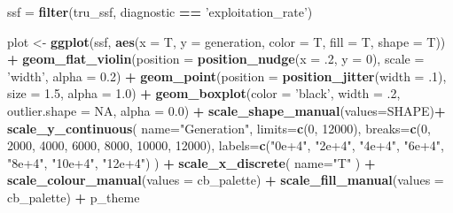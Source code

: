 \documentclass[]{book}
\newenvironment{Shaded}{\begin{snugshade}}{\end{snugshade}}
\newcommand{\DataTypeTok}[1]{\textcolor[rgb]{0.13,0.29,0.53}{#1}}
\newcommand{\DecValTok}[1]{\textcolor[rgb]{0.00,0.00,0.81}{#1}}
\newcommand{\FloatTok}[1]{\textcolor[rgb]{0.00,0.00,0.81}{#1}}
\newcommand{\KeywordTok}[1]{\textcolor[rgb]{0.13,0.29,0.53}{\textbf{#1}}}
\newcommand{\NormalTok}[1]{#1}
\newcommand{\OperatorTok}[1]{\textcolor[rgb]{0.81,0.36,0.00}{\textbf{#1}}}
\newcommand{\OtherTok}[1]{\textcolor[rgb]{0.56,0.35,0.01}{#1}}
\newcommand{\StringTok}[1]{\textcolor[rgb]{0.31,0.60,0.02}{#1}}
\begin{document}
\begin{Shaded}
\begin{Highlighting}[]
\NormalTok{ssf =}\StringTok{ }\KeywordTok{filter}\NormalTok{(tru_ssf, diagnostic }\OperatorTok{==}\StringTok{ 'exploitation_rate'}\NormalTok{)}

\NormalTok{plot <-}\StringTok{ }\KeywordTok{ggplot}\NormalTok{(ssf, }\KeywordTok{aes}\NormalTok{(}\DataTypeTok{x =}\NormalTok{ T, }\DataTypeTok{y =}\NormalTok{ generation, }\DataTypeTok{color =}\NormalTok{ T, }\DataTypeTok{fill =}\NormalTok{ T, }\DataTypeTok{shape =}\NormalTok{ T)) }\OperatorTok{+}
\StringTok{  }\KeywordTok{geom_flat_violin}\NormalTok{(}\DataTypeTok{position =} \KeywordTok{position_nudge}\NormalTok{(}\DataTypeTok{x =} \FloatTok{.2}\NormalTok{, }\DataTypeTok{y =} \DecValTok{0}\NormalTok{), }\DataTypeTok{scale =} \StringTok{'width'}\NormalTok{, }\DataTypeTok{alpha =} \FloatTok{0.2}\NormalTok{) }\OperatorTok{+}
\StringTok{  }\KeywordTok{geom_point}\NormalTok{(}\DataTypeTok{position =} \KeywordTok{position_jitter}\NormalTok{(}\DataTypeTok{width =} \FloatTok{.1}\NormalTok{), }\DataTypeTok{size =} \FloatTok{1.5}\NormalTok{, }\DataTypeTok{alpha =} \FloatTok{1.0}\NormalTok{) }\OperatorTok{+}
\StringTok{  }\KeywordTok{geom_boxplot}\NormalTok{(}\DataTypeTok{color =} \StringTok{'black'}\NormalTok{, }\DataTypeTok{width =} \FloatTok{.2}\NormalTok{, }\DataTypeTok{outlier.shape =} \OtherTok{NA}\NormalTok{, }\DataTypeTok{alpha =} \FloatTok{0.0}\NormalTok{) }\OperatorTok{+}
\StringTok{  }\KeywordTok{scale_shape_manual}\NormalTok{(}\DataTypeTok{values=}\NormalTok{SHAPE)}\OperatorTok{+}
\StringTok{  }\KeywordTok{scale_y_continuous}\NormalTok{(}
    \DataTypeTok{name=}\StringTok{"Generation"}\NormalTok{,}
    \DataTypeTok{limits=}\KeywordTok{c}\NormalTok{(}\DecValTok{0}\NormalTok{, }\DecValTok{12000}\NormalTok{),}
    \DataTypeTok{breaks=}\KeywordTok{c}\NormalTok{(}\DecValTok{0}\NormalTok{, }\DecValTok{2000}\NormalTok{, }\DecValTok{4000}\NormalTok{, }\DecValTok{6000}\NormalTok{, }\DecValTok{8000}\NormalTok{, }\DecValTok{10000}\NormalTok{, }\DecValTok{12000}\NormalTok{),}
    \DataTypeTok{labels=}\KeywordTok{c}\NormalTok{(}\StringTok{"0e+4"}\NormalTok{, }\StringTok{"2e+4"}\NormalTok{, }\StringTok{"4e+4"}\NormalTok{, }\StringTok{"6e+4"}\NormalTok{, }\StringTok{"8e+4"}\NormalTok{, }\StringTok{"10e+4"}\NormalTok{, }\StringTok{"12e+4"}\NormalTok{)}
\NormalTok{  ) }\OperatorTok{+}
\StringTok{  }\KeywordTok{scale_x_discrete}\NormalTok{(}
    \DataTypeTok{name=}\StringTok{"T"}
\NormalTok{  ) }\OperatorTok{+}
\StringTok{  }\KeywordTok{scale_colour_manual}\NormalTok{(}\DataTypeTok{values =}\NormalTok{ cb_palette) }\OperatorTok{+}
\StringTok{  }\KeywordTok{scale_fill_manual}\NormalTok{(}\DataTypeTok{values =}\NormalTok{ cb_palette) }\OperatorTok{+}
\StringTok{  }\NormalTok{p_theme}


\end{Highlighting}
\end{Shaded}
\end{document}
